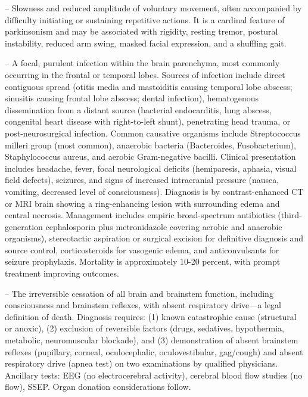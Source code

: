 -- Slowness and reduced amplitude of voluntary movement, often accompanied by difficulty initiating or sustaining repetitive actions. It is a cardinal feature of parkinsonism and may be associated with rigidity, resting tremor, postural instability, reduced arm swing, masked facial expression, and a shuffling gait.

-- A focal, purulent infection within the brain parenchyma, most commonly occurring in the frontal or temporal lobes. Sources of infection include direct contiguous spread (otitis media and mastoiditis causing temporal lobe abscess; sinusitis causing frontal lobe abscess; dental infection), hematogenous dissemination from a distant source (bacterial endocarditis, lung abscess, congenital heart disease with right-to-left shunt), penetrating head trauma, or post-neurosurgical infection. Common causative organisms include Streptococcus milleri group (most common), anaerobic bacteria (Bacteroides, Fusobacterium), Staphylococcus aureus, and aerobic Gram-negative bacilli. Clinical presentation includes headache, fever, focal neurological deficits (hemiparesis, aphasia, visual field defects), seizures, and signs of increased intracranial pressure (nausea, vomiting, decreased level of consciousness). Diagnosis is by contrast-enhanced CT or MRI brain showing a ring-enhancing lesion with surrounding edema and central necrosis. Management includes empiric broad-spectrum antibiotics (third-generation cephalosporin plus metronidazole covering aerobic and anaerobic organisms), stereotactic aspiration or surgical excision for definitive diagnosis and source control, corticosteroids for vasogenic edema, and anticonvulsants for seizure prophylaxis. Mortality is approximately 10-20 percent, with prompt treatment improving outcomes.

-- The irreversible cessation of all brain and brainstem function, including consciousness and brainstem reflexes, with absent respiratory drive—a legal definition of death. Diagnosis requires: (1) known catastrophic cause (structural or anoxic), (2) exclusion of reversible factors (drugs, sedatives, hypothermia, metabolic, neuromuscular blockade), and (3) demonstration of absent brainstem reflexes (pupillary, corneal, oculocephalic, oculovestibular, gag/cough) and absent respiratory drive (apnea test) on two examinations by qualified physicians. Ancillary tests: EEG (no electrocerebral activity), cerebral blood flow studies (no flow), SSEP. Organ donation considerations follow.

